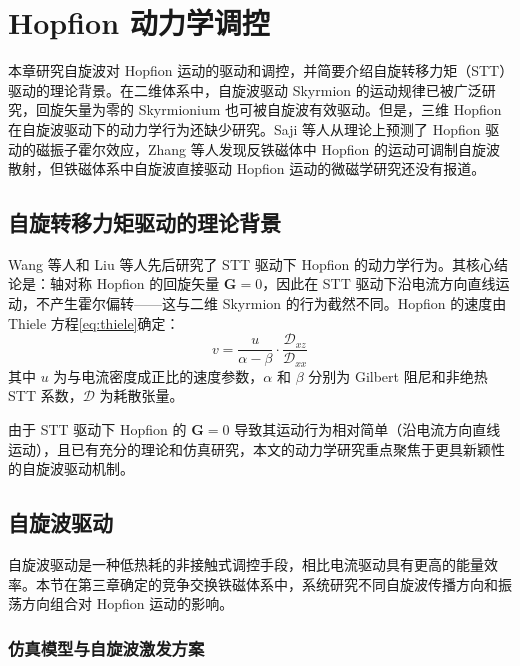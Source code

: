 \chapter{Hopfion 动力学调控}

本章研究自旋波对 Hopfion 运动的驱动和调控，并简要介绍自旋转移力矩（STT）驱动的理论背景。在二维体系中，自旋波驱动 Skyrmion 的运动规律已被广泛研究\cite{ding2015motion,huang2023transient}，回旋矢量为零的 Skyrmionium 也可被自旋波有效驱动\cite{shen2018skyrmionium}。但是，三维 Hopfion 在自旋波驱动下的动力学行为还缺少研究。Saji 等人从理论上预测了 Hopfion 驱动的磁振子霍尔效应\cite{saji2023magnonic}，Zhang 等人发现反铁磁体中 Hopfion 的运动可调制自旋波散射\cite{zhang2023magnon}，但铁磁体系中自旋波直接驱动 Hopfion 运动的微磁学研究还没有报道。


\section{自旋转移力矩驱动的理论背景}

Wang 等人\cite{wang2019current}和 Liu 等人\cite{liu2020three}先后研究了 STT 驱动下 Hopfion 的动力学行为。其核心结论是：轴对称 Hopfion 的回旋矢量 $\mathbf{G} = 0$，因此在 STT 驱动下沿电流方向直线运动，不产生霍尔偏转——这与二维 Skyrmion 的行为截然不同。Hopfion 的速度由 Thiele 方程\cref{eq:thiele}确定：
\begin{equation}
  v = \frac{u}{\alpha - \beta} \cdot \frac{\mathcal{D}_{xz}}{\mathcal{D}_{xx}}
  \label{eq:hopfion-stt-velocity}
\end{equation}
其中 $u$ 为与电流密度成正比的速度参数，$\alpha$ 和 $\beta$ 分别为 Gilbert 阻尼和非绝热 STT 系数，$\mathcal{D}$ 为耗散张量。

由于 STT 驱动下 Hopfion 的 $\mathbf{G} = 0$ 导致其运动行为相对简单（沿电流方向直线运动），且已有充分的理论和仿真研究\cite{wang2019current,liu2020three}，本文的动力学研究重点聚焦于更具新颖性的自旋波驱动机制。


\section{自旋波驱动}

自旋波驱动是一种低热耗的非接触式调控手段，相比电流驱动具有更高的能量效率。本节在第三章确定的竞争交换铁磁体系中，系统研究不同自旋波传播方向和振荡方向组合对 Hopfion 运动的影响。

\subsection{仿真模型与自旋波激发方案}


